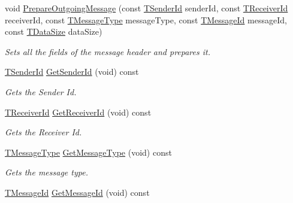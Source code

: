 \begin{DoxyCompactItemize}
\item 
void \hyperlink{class_terra_swarm_1_1_message_header_a6328694eb125adbac38c7e50d5fd40e1}{Prepare\-Outgoing\-Message} (const \hyperlink{class_terra_swarm_1_1_message_header_a516b36855e2aad7cfbf8770f1b42784f}{T\-Sender\-Id} sender\-Id, const \hyperlink{class_terra_swarm_1_1_message_header_aa3260702b182b6f88ddbdd3416e98df0}{T\-Receiver\-Id} receiver\-Id, const \hyperlink{class_terra_swarm_1_1_message_header_a6eaf3733d65fa5eaac0c223da4f5670c}{T\-Message\-Type} message\-Type, const \hyperlink{class_terra_swarm_1_1_message_header_acc3ebce9679077b0e438532be7c7bf6d}{T\-Message\-Id} message\-Id, const \hyperlink{namespace_terra_swarm_a092e6ec9739175076ae3106783f5c1b6}{T\-Data\-Size} data\-Size)
\begin{DoxyCompactList}\small\item\em Sets all the fields of the message header and prepares it. \end{DoxyCompactList}\item 
\hyperlink{class_terra_swarm_1_1_message_header_a516b36855e2aad7cfbf8770f1b42784f}{T\-Sender\-Id} \hyperlink{class_terra_swarm_1_1_message_header_abd4750b2bab3760208f7016c5fe24f38}{Get\-Sender\-Id} (void) const 
\begin{DoxyCompactList}\small\item\em Gets the Sender Id. \end{DoxyCompactList}\item 
\hyperlink{class_terra_swarm_1_1_message_header_aa3260702b182b6f88ddbdd3416e98df0}{T\-Receiver\-Id} \hyperlink{class_terra_swarm_1_1_message_header_a83dd1c28d2523cee08b418bda8372234}{Get\-Receiver\-Id} (void) const 
\begin{DoxyCompactList}\small\item\em Gets the Receiver Id. \end{DoxyCompactList}\item 
\hyperlink{class_terra_swarm_1_1_message_header_a6eaf3733d65fa5eaac0c223da4f5670c}{T\-Message\-Type} \hyperlink{class_terra_swarm_1_1_message_header_a70949a1f6ad6a41333c3a46d0166451c}{Get\-Message\-Type} (void) const 
\begin{DoxyCompactList}\small\item\em Gets the message type. \end{DoxyCompactList}\item 
\hyperlink{class_terra_swarm_1_1_message_header_acc3ebce9679077b0e438532be7c7bf6d}{T\-Message\-Id} \hyperlink{class_terra_swarm_1_1_message_header_a9233350f349d3de319c55ca92b3170de}{Get\-Message\-Id} (void) const 

\end{DoxyCompactItemize}
